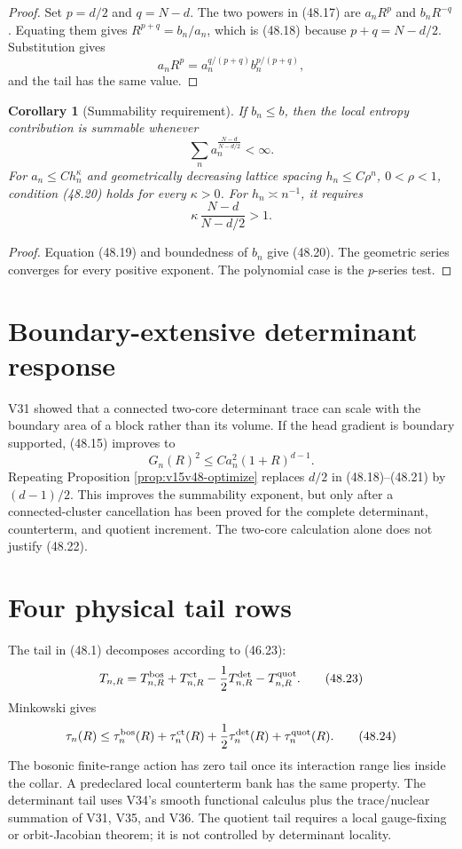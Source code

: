 \documentclass[11pt]{article}
\newtheorem{corollary}[theorem]{Corollary}
\theoremstyle{remark}
\begin{document}
\begin{proof}
Set
\(p=d/2\) and \(q=N-d\).  The two powers in (48.17) are
\(a_nR^p\) and \(b_nR^{-q}\).  Equating them gives
\(R^{p+q}=b_n/a_n\), which is (48.18) because
\(p+q=N-d/2\).  Substitution gives
\[
 a_nR^p
 =a_n^{q/(p+q)}b_n^{p/(p+q)},
\]
and the tail has the same value.
\end{proof}

\begin{corollary}[Summability requirement]
\label{cor:v15v48-summability}
If \(b_n\leq b\), then the local entropy contribution is summable
whenever
\[
 \sum_n
 a_n^{\frac{N-d}{N-d/2}}<\infty.                        \tag{48.20}
\]
For \(a_n\leq Ch_n^\kappa\) and geometrically decreasing lattice
spacing \(h_n\leq C\rho^n\), \(0<\rho<1\), condition (48.20) holds
for every \(\kappa>0\).  For \(h_n\asymp n^{-1}\), it requires
\[
 \kappa\,\frac{N-d}{N-d/2}>1.                           \tag{48.21}
\]
\end{corollary}

\begin{proof}
Equation (48.19) and boundedness of \(b_n\) give (48.20).
The geometric series converges for every positive exponent.  The
polynomial case is the \(p\)-series test.
\end{proof}

\section{Boundary-extensive determinant response}

V31 showed that a connected two-core determinant trace can scale
with the boundary area of a block rather than its volume.  If the
head gradient is boundary supported, (48.15) improves to
\[
 G_n(R)^2\leq Ca_n^2(1+R)^{d-1}.                        \tag{48.22}
\]
Repeating Proposition \ref{prop:v15v48-optimize} replaces
\(d/2\) in (48.18)--(48.21) by \((d-1)/2\).  This improves the
summability exponent, but only after a connected-cluster
cancellation has been proved for the complete determinant,
counterterm, and quotient increment.  The two-core calculation
alone does not justify (48.22).

\section{Four physical tail rows}

The tail in (48.1) decomposes according to (46.23):
\[
 T_{n,R}=T_{n,R}^{\rm bos}
 +T_{n,R}^{\rm ct}
 -\frac12T_{n,R}^{\rm det}
 -T_{n,R}^{\rm quot}.                                   \tag{48.23}
\]
Minkowski gives
\[
 \tau_n(R)\leq
 \tau_n^{\rm bos}(R)+\tau_n^{\rm ct}(R)
 +\frac12\tau_n^{\rm det}(R)+\tau_n^{\rm quot}(R).      \tag{48.24}
\]
The bosonic finite-range action has zero tail once its interaction
range lies inside the collar.  A predeclared local counterterm bank
has the same property.  The determinant tail uses V34's smooth
functional calculus plus the trace/nuclear summation of V31,
V35, and V36.  The quotient tail requires a local gauge-fixing or
orbit-Jacobian theorem; it is not controlled by determinant
locality.
\end{document}
